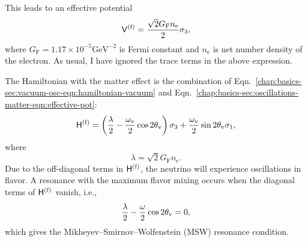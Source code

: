 This leads to an effective potential
\begin{equation}
\mathsf V^{(\ff)} = \frac{\sqrt{2}G_{\mathrm F} n_{\mathrm e} }{2}  \sigma_3,
\label{chap:basics-sec:oscillations-matter-eqn:effective-pot}
\end{equation}
where $G_{\mathrm F}=1.17\times 10^{-5}\mathrm{GeV^{-2}}$ is Fermi constant and $n_{\mathrm e}$ is net number density of the electron. As usual, I have ignored the trace terms in the above expression.

The Hamiltonian with the matter effect is the combination of Eqn.~\eqref{chap:basics-sec:vacuum-osc-eqn:hamiltonian-vacuum} and Eqn.~\eqref{chap:basics-sec:oscillations-matter-eqn:effective-pot}:
\begin{equation}
\mathsf H^{(\ff)} = \left(\frac{\lambda}{2} -\frac{ \omega_\vv }{2} \cos 2\theta_\vv \right) {\sigma}_3  + \frac{ \omega_\vv }{2} \sin 2\theta_\vv {\sigma}_1,
\label{chap:basics-sec:msw-eqn:hamiltonian-matter-effect}
\end{equation}
where
\begin{equation}
  \lambda = \sqrt{2}G_{\mathrm F} n_{\mathrm e}.
  \label{chap:basics-sec:oscillations-matter-eqn:lambda}
\end{equation}
Due to the off-diagonal terms in $\mathsf H^{(\mathrm f)}$, the neutrino will experience oscillations in flavor. A resonance with the maximum flavor mixing occurs when the diagonal terms of $\mathsf H^{(\mathrm f)}$ vanish, i.e.,
\begin{equation}
\frac{\lambda}{2} -\frac{ \omega }{2} \cos 2\theta_\vv  = 0,
\label{chap:basics-eqn:msw-resonance}
\end{equation}
which gives the Mikheyev--Smirnov--Wolfenstein (MSW) resonance condition.


